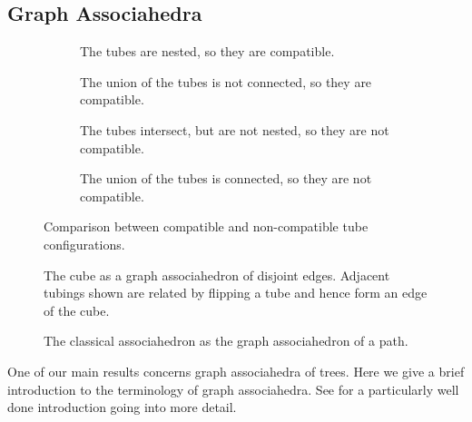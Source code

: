 \documentclass[fontsize=11pt,a4paper,DIV=12]{scrartcl}
\begin{document}
\subsection{Graph Associahedra}

\begin{figure}[!ht]
	\centering
	\begin{subfigure}{0.24\textwidth}
		\centering
		
		\caption{The tubes are nested, so they are compatible.}
		\label{fig:compat_1}
	\end{subfigure}%
	\hfill
	\begin{subfigure}{0.24\textwidth}
		\centering
		
		\caption{The union of the tubes is not connected, so they are compatible.}
		\label{fig:compat_2}
	\end{subfigure}%
	\hfill
	\begin{subfigure}{0.24\textwidth}
		\centering
		
		\caption{The tubes intersect, but are not nested, so they are not compatible.}
		\label{fig:not_compat_1}
	\end{subfigure}%
	\hfill
	\begin{subfigure}{0.24\textwidth}
		\centering
		
		\caption{The union of the tubes is connected, so they are not compatible.}
		\label{fig:not_compat_2}
	\end{subfigure}

	\caption{Comparison between compatible and non-compatible tube configurations.}
	\label{fig:tubes_comparison}
\end{figure}

\begin{figure}
	\centering
	
	\caption{The cube as a graph associahedron of disjoint edges. Adjacent tubings shown are related by flipping a tube and hence form an edge of the cube.}
	\label{fig:cube_graph_asso}
\end{figure}

\begin{figure}
	\centering
	
	\caption{The classical associahedron as the graph associahedron of a path.}
	\label{fig:classical_asso_as_graph_asso}
\end{figure}

One of our main results concerns graph associahedra of trees. Here we give a brief introduction to the terminology of graph associahedra. See \cite{celebrating_associahedron} for a particularly well done introduction going into more detail.
\end{document}
